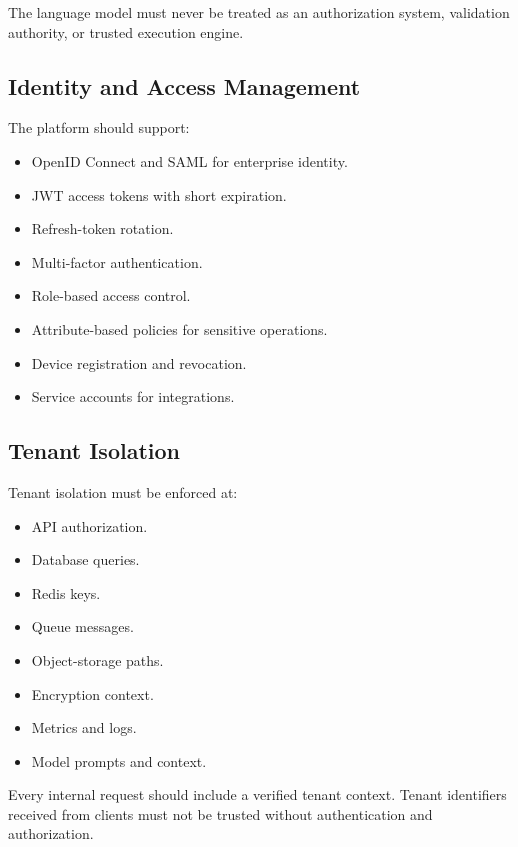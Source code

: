 \documentclass[11pt,a4paper]{article}
\begin{document}
\begin{securitybox}
The language model must never be treated as an authorization system,
validation authority, or trusted execution engine.
\end{securitybox}

\subsection{Identity and Access Management}

The platform should support:

\begin{itemize}
\item OpenID Connect and SAML for enterprise identity.
\item JWT access tokens with short expiration.
\item Refresh-token rotation.
\item Multi-factor authentication.
\item Role-based access control.
\item Attribute-based policies for sensitive operations.
\item Device registration and revocation.
\item Service accounts for integrations.
\end{itemize}

\subsection{Tenant Isolation}

Tenant isolation must be enforced at:

\begin{itemize}
\item API authorization.
\item Database queries.
\item Redis keys.
\item Queue messages.
\item Object-storage paths.
\item Encryption context.
\item Metrics and logs.
\item Model prompts and context.
\end{itemize}

Every internal request should include a verified tenant context. Tenant
identifiers received from clients must not be trusted without
authentication and authorization.
\end{document}
